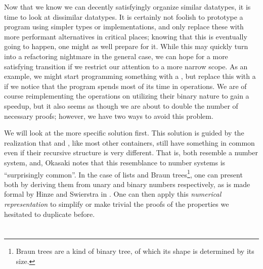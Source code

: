 
Now that we know we can decently satisfyingly organize similar datatypes, it is time to look at dissimilar datatypes. It is certainly not foolish to prototype a program using simpler types or implementations, and only replace these with more performant alternatives in critical places; knowing that this is eventually going to happen, one might as well prepare for it. While this may quickly turn into a refactoring nightmare in the general case, we can hope for a more satisfying transition if we restrict our attention to a more narrow scope. As an example, we might start programming something with a , but replace this with a  if we notice that the program spends most of its time in  operations. We are of course reimplementing the operations on  utilizing their binary nature to gain a speedup, but it also seems as though we are about to double the number of necessary proofs; however, we have two ways to avoid this problem. 

We will look at the more specific solution first. This solution is guided by the realization that  and , like most other containers, still have something in common even if their recursive structure is very different. That is, both resemble a number system, and, Okasaki \cite{purelyfunctional} notes that this resemblance to number systems is ``surprisingly common''. In the case of lists and Braun trees\footnote{Braun trees are a kind of binary tree, of which its shape is determined by its size.}, one can present both by deriving them from unary and binary numbers respectively, as is made formal by Hinze and Swierstra in \cite{calcdata}. One can then apply this \textit{numerical representation} to simplify or make trivial the proofs of the properties we hesitated to duplicate before.




\section{}

